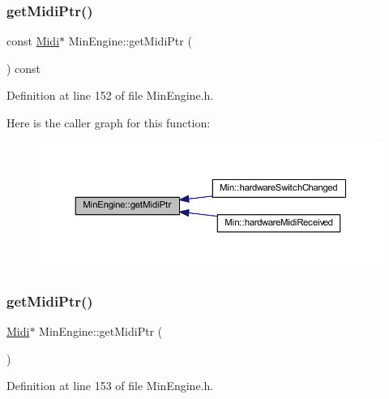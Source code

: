 \subsubsection{\texorpdfstring{get\+Midi\+Ptr()}{getMidiPtr()}\hspace{0.1cm}{\footnotesize\ttfamily [1/2]}}
{\footnotesize\ttfamily const \hyperlink{class_midi}{Midi}$\ast$ Min\+Engine\+::get\+Midi\+Ptr (\begin{DoxyParamCaption}{ }\end{DoxyParamCaption}) const\hspace{0.3cm}{\ttfamily [inline]}}



Definition at line 152 of file Min\+Engine.\+h.

Here is the caller graph for this function\+:
\nopagebreak
\begin{figure}[H]
\begin{center}
\leavevmode
\includegraphics[width=350pt]{class_min_engine_ab6c3bb750ae223f9b31b94bb2f21f082_icgraph}
\end{center}
\end{figure}
\mbox{\label{class_min_engine_a5584f12b5e32a683a6e542fcc3b2ef30}} 
\subsubsection{\texorpdfstring{get\+Midi\+Ptr()}{getMidiPtr()}\hspace{0.1cm}{\footnotesize\ttfamily [2/2]}}
{\footnotesize\ttfamily \hyperlink{class_midi}{Midi}$\ast$ Min\+Engine\+::get\+Midi\+Ptr (\begin{DoxyParamCaption}{ }\end{DoxyParamCaption})\hspace{0.3cm}{\ttfamily [inline]}}



Definition at line 153 of file Min\+Engine.\+h.


